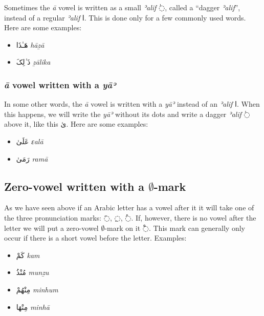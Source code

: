 \documentclass[
  10pt,
]{book}
\providecommand{\tightlist}{%
  \setlength{\itemsep}{0pt}\setlength{\parskip}{0pt}}
\begin{document}
Sometimes the \emph{ā} vowel is written as a small \emph{ʾalif} \foreignlanguage{arabic}{◌ٰ}, called a \enquote{dagger \emph{ʾalif}}, instead of a regular \emph{ʾalif} \foreignlanguage{arabic}{ا}. This is done only for a few commonly used words. Here are some examples:

\begin{itemize}
\tightlist
\item
  \foreignlanguage{arabic}{هَـٰذَا} \emph{hāẕā}
\item
  \foreignlanguage{arabic}{ذَ~ٰلِکَ} \emph{ẕālika}
\end{itemize}

\subsubsection{\texorpdfstring{\emph{ā} vowel written with a \emph{yāʾ}}{ā vowel written with a yāʾ}}\label{a-vowel-written-with-a-ya}

In some other words, the \emph{ā} vowel is written with a \emph{yāʾ} instead of an \emph{ʾalif} \foreignlanguage{arabic}{ا}. When this happens, we will write the \emph{yāʾ} without its dots and write a dagger \emph{ʾalif} \foreignlanguage{arabic}{◌ٰ} above it, like this \foreignlanguage{arabic}{ىٰ}. Here are some examples:

\begin{itemize}
\tightlist
\item
  \foreignlanguage{arabic}{عَلَىٰ} \emph{ɛalā}
\item
  \foreignlanguage{arabic}{رَمَىٰ} \emph{ramā}
\end{itemize}

\subsection{\texorpdfstring{Zero-vowel written with a \(\emptyset\)-mark}{Zero-vowel written with a \textbackslash emptyset-mark}}\label{zero-vowel-written-with-a-emptyset-mark}

As we have seen above if an Arabic letter has a vowel after it it will take one of the three pronunciation marks: \foreignlanguage{arabic}{◌َ}, \foreignlanguage{arabic}{◌ِ}, \foreignlanguage{arabic}{◌ُ}. If, however, there is no vowel after the letter we will put a zero-vowel \(\emptyset\)-mark on it \foreignlanguage{arabic}{◌ْ}. This mark can generally only occur if there is a short vowel before the letter. Examples:

\begin{itemize}
\tightlist
\item
  \foreignlanguage{arabic}{کَمْ} \emph{kam}
\item
  \foreignlanguage{arabic}{مُنْذُ} \emph{munẕu}
\item
  \foreignlanguage{arabic}{مِنْهُمْ} \emph{minhum}
\item
  \foreignlanguage{arabic}{مِنْهَا} \emph{minhā}
\end{itemize}
\end{document}
